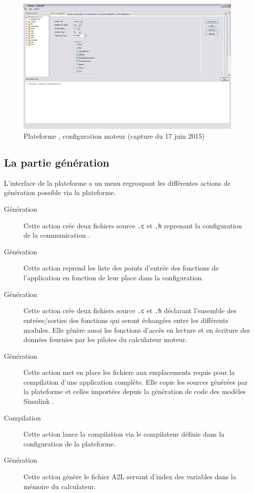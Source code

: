 \begin{figure}[h]
  \centering
  \includegraphics[scale=0.2]{images/plateforme}
  \caption{Plateforme , configuration moteur (capture du 17 juin 2015)}
  \label{fig:plateforme}
\end{figure}

\subsection{La partie génération}
L'interface de la plateforme a un menu regroupant les différentes actions de génération possible via la plateforme.
\begin{description}
  \item[Génération ] Cette action crée deux fichiers source {\tt.c} et {\tt .h} reprenant la configuration de la communication .
  \item[Génération ] Cette action reprend les liste des points d'entrée des fonctions de l'application en fonction de leur place dans la configuration.
  \item[Génération ] Cette action crée deux fichiers source {\tt.c} et {\tt .h} déclarant l'ensemble des entrées/sorties des fonctions qui seront échangées entre les différents modules. Elle génère aussi les fonctions d'accès en lecture et en écriture des données fournies par les pilotes du calculateur moteur.
  \item[Génération ] Cette action met en place les fichiers aux emplacements requis pour la compilation d'une application complète. Elle copie les sources générées par la plateforme et celles importées depuis la génération de code des modèles Simulink \up{\circledR}.
  \item[Compilation] Cette action lance la compilation via le compilateur définie dans la configuration de la plateforme.
  \item[Génération ] Cette action génère le fichier A2L servant d'index des variables dans la mémoire du calculateur.
\end{description}

